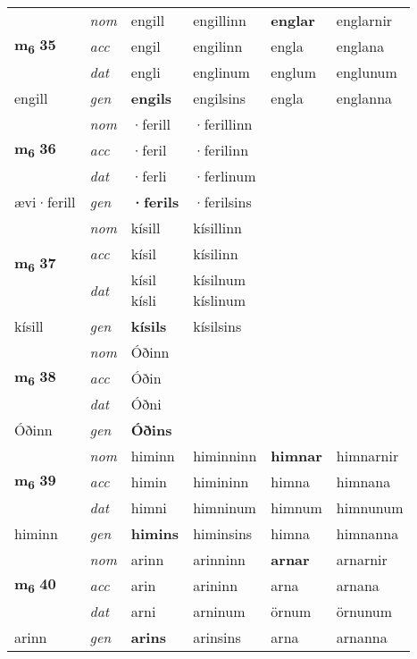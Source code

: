 \begin{longtable}[l]{X>{\footnotesize\itshape}XXXXX}
\multirow{3}{*}{{{\textbf{m{\textsubscript{6}}} \Large{\textbf{35}}}}} & nom & engill & engillinn & \textbf{englar} & englarnir \\*
 & acc & engil & engilinn & engla & englana \\*
 & dat & engli & englinum & englum & englunum \\*
 {\footnotesize{engill}} & gen & \textbf{engils} & engilsins & engla & englanna \\
\midrule

\multirow{3}{*}{{{\textbf{m{\textsubscript{6}}} \Large{\textbf{36}}}}} & nom & ·ferill & ·ferillinn & \textbf{} &  \\*
 & acc & ·feril & ·ferilinn &  &  \\*
 & dat & ·ferli & ·ferlinum &  &  \\*
 {\footnotesize{ævi\allowbreak ·ferill}} & gen & \textbf{·ferils} & ·ferilsins &  &  \\
\midrule

\multirow{3}{*}{{{\textbf{m{\textsubscript{6}}} \Large{\textbf{37}}}}} & nom & kísill & kísillinn & \textbf{} &  \\*
 & acc & kísil & kísilinn &  &  \\*
 & dat & \specialcell{kísil\\ kísli} & \specialcell{kísilnum\\ kíslinum} &  &  \\*
 {\footnotesize{kísill}} & gen & \textbf{kísils} & kísilsins &  &  \\
\midrule

\multirow{3}{*}{{{\textbf{m{\textsubscript{6}}} \Large{\textbf{38}}}}} & nom & Óðinn &  & \textbf{} &  \\*
 & acc & Óðin &  &  &  \\*
 & dat & Óðni &  &  &  \\*
 {\footnotesize{Óðinn}} & gen & \textbf{Óðins} &  &  &  \\
\midrule

\multirow{3}{*}{{{\textbf{m{\textsubscript{6}}} \Large{\textbf{39}}}}} & nom & himinn & himinninn & \textbf{himnar} & himnarnir \\*
 & acc & himin & himininn & himna & himnana \\*
 & dat & himni & himninum & himnum & himnunum \\*
 {\footnotesize{himinn}} & gen & \textbf{himins} & himinsins & himna & himnanna \\
\midrule

\multirow{3}{*}{{{\textbf{m{\textsubscript{6}}} \Large{\textbf{40}}}}} & nom & arinn & arinninn & \textbf{arnar} & arnarnir \\*
 & acc & arin & arininn & arna & arnana \\*
 & dat & arni & arninum & örnum & örnunum \\*
 {\footnotesize{arinn}} & gen & \textbf{arins} & arinsins & arna & arnanna \\
\midrule


\end{longtable}
